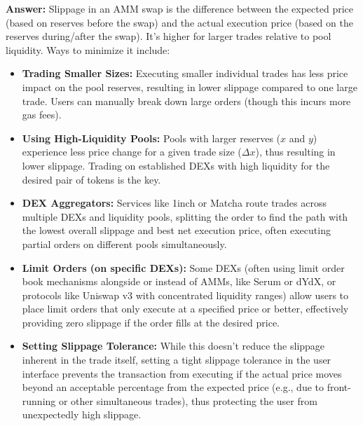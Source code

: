 \documentclass[12pt]{article}
\begin{document}
\textbf{Answer:} Slippage in an AMM swap is the difference between the expected price (based on reserves before the swap) and the actual execution price (based on the reserves during/after the swap). It's higher for larger trades relative to pool liquidity. Ways to minimize it include:
\begin{itemize}
    \item \textbf{Trading Smaller Sizes:} Executing smaller individual trades has less price impact on the pool reserves, resulting in lower slippage compared to one large trade. Users can manually break down large orders (though this incurs more gas fees).
    \item \textbf{Using High-Liquidity Pools:} Pools with larger reserves ($x$ and $y$) experience less price change for a given trade size ($\Delta x$), thus resulting in lower slippage. Trading on established DEXs with high liquidity for the desired pair of tokens is the key.
    \item \textbf{DEX Aggregators:} Services like 1inch or Matcha route trades across multiple DEXs and liquidity pools, splitting the order to find the path with the lowest overall slippage and best net execution price, often executing partial orders on different pools simultaneously.
    \item \textbf{Limit Orders (on specific DEXs):} Some DEXs (often using limit order book mechanisms alongside or instead of AMMs, like Serum or dYdX, or protocols like Uniswap v3 with concentrated liquidity ranges) allow users to place limit orders that only execute at a specified price or better, effectively providing zero slippage if the order fills at the desired price.
    \item \textbf{Setting Slippage Tolerance:} While this doesn't reduce the slippage inherent in the trade itself, setting a tight slippage tolerance in the user interface prevents the transaction from executing if the actual price moves beyond an acceptable percentage from the expected price (e.g., due to front-running or other simultaneous trades), thus protecting the user from unexpectedly high slippage.
\end{itemize}

\end{document}
